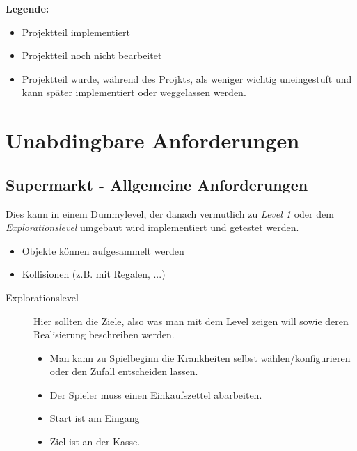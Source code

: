 ﻿\documentclass[a4paper, 11pt]{scrartcl}
\title{\documenttitle}
\author{\authors}
\date{\dateversion}
\newcommand{\fertig}{\color{ForestGreen}}
\newcommand{\unwichtig}{\color{Gray}}
\begin{document}
\maketitle

{\bfseries Legende:}
\begin{itemize}
    \item {\fertig Projektteil implementiert}
    \item {Projektteil noch nicht bearbeitet}
    \item {\unwichtig Projektteil wurde, während des Projkts, als weniger
    wichtig uneingestuft und kann später implementiert oder weggelassen werden.}
\end{itemize}

\section{Unabdingbare Anforderungen}
\subsection{Supermarkt - Allgemeine Anforderungen}
Dies kann in einem Dummylevel, der danach vermutlich zu \emph{Level 1}
oder dem \emph{Explorationslevel} umgebaut wird implementiert und
getestet werden.
\begin{itemize}
    \item Objekte können aufgesammelt werden
    \item Kollisionen (z.B. mit Regalen, ...)
\end{itemize}
%
%
\begin{description}
    \item[Explorationslevel}
    Ein Level in dem man keine Aufgaben erledigen muss aber verschiedene
    Krankheiten testen kann. Dh. man kann zur Laufzeit Krankheiten
    "zu- und abschalten" und diese auch zur Laufzeit dynamisch
    konfigurieren. → GUI
    \item[Level 1]
    Hier sollten die Ziele, also was man mit dem Level zeigen will sowie
    deren Realisierung beschreiben werden.\\
    \begin{itemize}
        \item Man kann zu Spielbeginn die Krankheiten selbst
        wählen/konfigurieren oder den Zufall entscheiden lassen.
        \item Der Spieler muss einen Einkaufszettel abarbeiten.
        \item Start ist am Eingang
        \item Ziel ist an der Kasse.
    \end{itemize}
\end{description}
\end{document}
